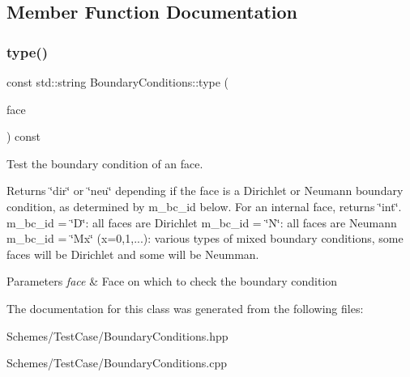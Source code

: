 \subsection{Member Function Documentation}
\mbox{\label{classBoundaryConditions_a2d4ed623f0f8b4585cbe75454777e14c}} 
\subsubsection{\texorpdfstring{type()}{type()}}
{\footnotesize\ttfamily const std\+::string Boundary\+Conditions\+::type (\begin{DoxyParamCaption}\item[{const \hyperlink{classHArDCore3D_1_1Face}{Face} \&}]{face }\end{DoxyParamCaption}) const}



Test the boundary condition of an face. 

\begin{DoxyReturn}{Returns}
\char`\"{}dir\char`\"{} or \char`\"{}neu\char`\"{} depending if the face is a Dirichlet or Neumann boundary condition, as determined by m\+\_\+bc\+\_\+id below. For an internal face, returns \char`\"{}int\char`\"{}. m\+\_\+bc\+\_\+id = \char`\"{}\+D\char`\"{}\+: all faces are Dirichlet m\+\_\+bc\+\_\+id = \char`\"{}\+N\char`\"{}\+: all faces are Neumann m\+\_\+bc\+\_\+id = \char`\"{}\+Mx\char`\"{} (x=0,1,...)\+: various types of mixed boundary conditions, some faces will be Dirichlet and some will be Neumman. 
\end{DoxyReturn}

\begin{DoxyParams}{Parameters}
{\em face} & Face on which to check the boundary condition \\
\hline
\end{DoxyParams}


The documentation for this class was generated from the following files\+:\begin{DoxyCompactItemize}
\item 
Schemes/\+Test\+Case/Boundary\+Conditions.\+hpp\item 
Schemes/\+Test\+Case/Boundary\+Conditions.\+cpp\end{DoxyCompactItemize}
